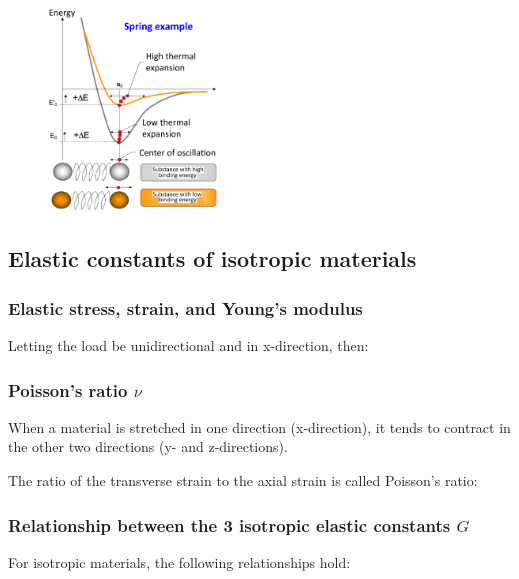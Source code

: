 \documentclass{article}
\begin{document}
\phantom{}

\begin{figure}[ht!]
  \begin{flushright}
    \includegraphics[width=0.4\textwidth]{media/atomic_energy_distance.png}
  \end{flushright}
\end{figure}
\wrapfill

\vspace*{-8.6cm}

\subsection{Elastic constants of isotropic materials}
\subsubsection{Elastic stress, strain, and Young's modulus}
Letting the load be unidirectional and in x-direction, then:

\subsubsection{Poisson's ratio $\nu$}
When a material is stretched in one direction (x-direction), it tends to contract in the other two directions (y- and z-directions).

The ratio of the transverse strain to the axial strain is called Poisson's ratio:

\subsubsection{Relationship between the 3 isotropic elastic constants $G$}
For isotropic materials, the following relationships hold:
\end{document}

